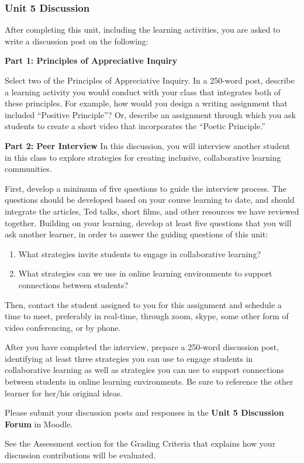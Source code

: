 \documentclass[
]{book}
\providecommand{\tightlist}{%
  \setlength{\itemsep}{0pt}\setlength{\parskip}{0pt}}
\begin{document}
\begin{assessment}
\hypertarget{unit-5-discussion}{%
\subsubsection{Unit 5 Discussion}\label{unit-5-discussion}}

After completing this unit, including the learning activities, you are
asked to write a discussion post on the following:

\textbf{Part 1: Principles of Appreciative Inquiry}

Select two of the Principles of Appreciative Inquiry. In a 250-word
post, describe a learning activity you would conduct with your class
that integrates both of these principles. For example, how would you
design a writing assignment that included ``Positive Principle''? Or,
describe an assignment through which you ask students to create a short
video that incorporates the ``Poetic Principle.''

\textbf{Part 2: Peer Interview} In this discussion, you will interview
another student in this class to explore strategies for creating
inclusive, collaborative learning communities.

First, develop a minimum of five questions to guide the interview
process. The questions should be developed based on your course learning
to date, and should integrate the articles, Ted talks, short films, and
other resources we have reviewed together. Building on your learning,
develop at least five questions that you will ask another learner, in
order to answer the guiding questions of this unit:

\begin{enumerate}
\def\labelenumi{\arabic{enumi}.}
\tightlist
\item
  What strategies invite students to engage in collaborative learning?
\item
  What strategies can we use in online learning environments to support
  connections between students?
\end{enumerate}

Then, contact the student assigned to you for this assignment and
schedule a time to meet, preferably in real-time, through zoom, skype,
some other form of video conferencing, or by phone.

After you have completed the interview, prepare a 250-word discussion
post, identifying at least three strategies you can use to engage
students in collaborative learning as well as strategies you can use to
support connections between students in online learning environments. Be
sure to reference the other learner for her/his original ideas.

Please submit your discussion posts and responses in the \textbf{Unit 5
Discussion Forum} in Moodle.

See the Assessment section for the Grading Criteria that explains how
your discussion contributions will be evaluated.
\end{assessment}
\end{document}
